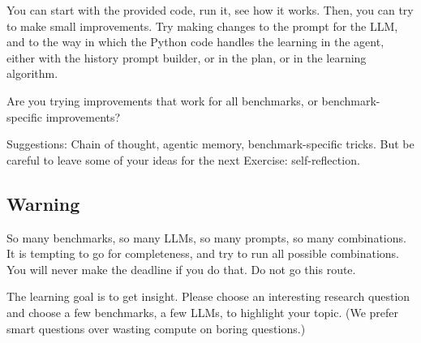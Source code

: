 \documentclass[a4]{article}
\begin{document}
You can start with the provided code, run it, see how it works. Then, you can try to make small improvements. Try making changes to the prompt for the LLM, and to the way in which the Python code handles the learning in the agent, either with the history prompt builder, or in the plan, or in the learning algorithm.

Are you trying improvements that work for all  benchmarks, or benchmark-specific improvements?

Suggestions: Chain of thought, agentic memory, benchmark-specific tricks. But be careful to leave some of your ideas for the next Exercise: self-reflection.

\subsection{Warning}
So many benchmarks, so many LLMs, so many prompts, so many combinations. It is tempting to go for completeness, and try to run all possible combinations. You will never make the deadline if you do that. Do not go this route. 

The learning goal is to get insight. Please choose an interesting research question and choose a few benchmarks, a few LLMs, to highlight your topic. (We prefer smart questions over wasting compute on boring questions.) 
\end{document}
